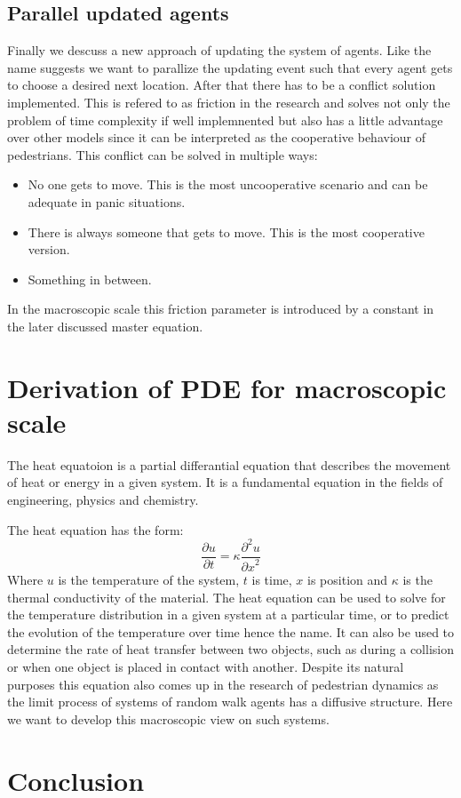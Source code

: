 \subsection{Parallel updated agents}
Finally we descuss a new approach of updating the system of agents. Like the name suggests we want to parallize the 
updating event such that every agent gets to choose a desired next location. After that there has to be a conflict solution implemented.
This is refered to as friction in the research and solves not only the problem of time complexity if well implemnented but 
also has a little advantage over other models since it can be interpreted as the cooperative behaviour of pedestrians. 
This conflict can be solved in multiple ways: 
\begin{itemize}
   \item No one gets to move. This is the most uncooperative scenario and can be adequate in panic situations.
   \item There is always someone that gets to move. This is the most cooperative version.
   \item Something in between. 
\end{itemize} 
In the macroscopic scale this friction parameter is introduced by a constant in the later discussed master equation.

\newpage
\section{Derivation of PDE for macroscopic scale}
The heat equatoion is a partial differantial equation that describes the movement of heat or energy in a given system.
It is a fundamental equation in the fields of engineering, physics and chemistry.

The heat equation has the form: 
\begin{equation}
\frac{\partial u}{\partial t} = \kappa \frac{{\partial}^2u}{{\partial x}^2}
\end{equation}
Where $u$ is the temperature of the system, $t$ is time, $x$ is position and $\kappa$ is the thermal conductivity of the material.
The heat equation can be used to solve for the temperature distribution in a given system at a particular time, or to predict the evolution 
of the temperature over time hence the name. It can also be used to determine the rate of heat transfer between two objects, such as during a 
collision or when one object is placed in contact with another.
Despite its natural purposes this equation also comes up in the research of pedestrian dynamics as the limit process of systems of random walk agents 
has a diffusive structure. Here we want to develop this macroscopic view on such systems.


\newpage
\section{Conclusion}


\newpage





